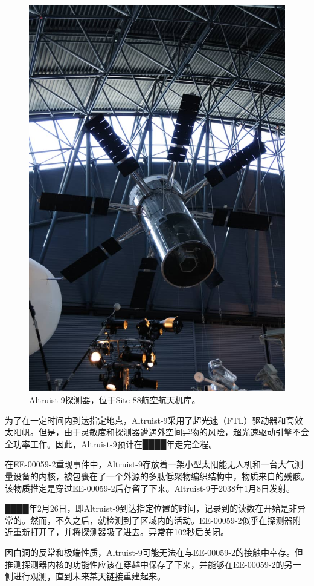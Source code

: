 \hr

\begin{scpbox}


\end{scpbox}

\begin{scpbox}
    
\begin{figure}[H]
    \centering
    \includegraphics[width=0.5\linewidth]{images/SCP-001-the-world-at-large.jpg}
    \caption*{Altruist-9探测器，位于Site-88航空航天机库。}
\end{figure}


为了在一定时间内到达指定地点，Altruist-9采用了超光速（FTL）驱动器和高效太阳帆。但是，由于灵敏度和探测器遭遇外空间异物的风险，超光速驱动引擎不会全功率工作。因此，Altruist-9预计在████年走完全程。

在EE-00059-2重现事件中，Altruist-9存放着一架小型太阳能无人机和一台大气测量设备的内核，被包裹在了一个外源的多肽低聚物编织结构中，物质来自\mono{{[}数据删除，见下]}的残骸。该物质推定是穿过EE-00059-2后存留了下来。Altruist-9于2038年1月8日发射。


████年2月26日，即Altruist-9到达指定位置的时间，记录到的读数在开始是非异常的。然而，不久之后，就检测到了区域内的活动。EE-00059-2似乎在探测器附近重新打开了，并将探测器吸了进去。异常在102秒后关闭。

因白洞的反常和极端性质，Altruist-9可能无法在与EE-00059-2的接触中幸存。但推测探测器内核的功能性应该在穿越中保存了下来，并能够在EE-00059-2的另一侧进行观测，直到未来某天链接重建起来。

\end{scpbox}

